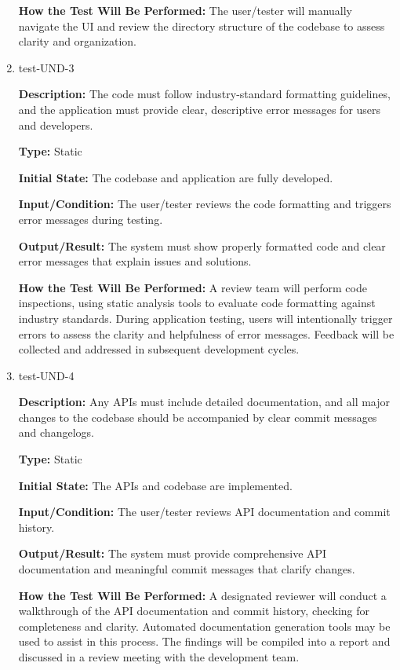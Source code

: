 \documentclass[12pt, titlepage]{article}
\begin{document}
\begin{enumerate}
\textbf{How the Test Will Be Performed:} The user/tester will manually navigate the UI and review the directory structure of the codebase to assess clarity and organization.

\item{test-UND-3\\}

\textbf{Description:} The code must follow industry-standard formatting guidelines, and the application must provide clear, descriptive error messages for users and developers.

\textbf{Type:} Static
					
\textbf{Initial State:} The codebase and application are fully developed.
					
\textbf{Input/Condition:} The user/tester reviews the code formatting and triggers error messages during testing.
					
\textbf{Output/Result:} The system must show properly formatted code and clear error messages that explain issues and solutions.
					
\textbf{How the Test Will Be Performed:} A review team will perform code inspections, using static analysis tools to evaluate code formatting against industry standards. During application testing, users will intentionally trigger errors to assess the clarity and helpfulness of error messages. Feedback will be collected and addressed in subsequent development cycles.

\item{test-UND-4\\}

\textbf{Description:} Any APIs must include detailed documentation, and all major changes to the codebase should be accompanied by clear commit messages and changelogs.

\textbf{Type:} Static
					
\textbf{Initial State:} The APIs and codebase are implemented.
					
\textbf{Input/Condition:} The user/tester reviews API documentation and commit history.
					
\textbf{Output/Result:} The system must provide comprehensive API documentation and meaningful commit messages that clarify changes.
					
\textbf{How the Test Will Be Performed:} A designated reviewer will conduct a walkthrough of the API documentation and commit history, checking for completeness and clarity. Automated documentation generation tools may be used to assist in this process. The findings will be compiled into a report and discussed in a review meeting with the development team.


\end{enumerate}
\end{document}
